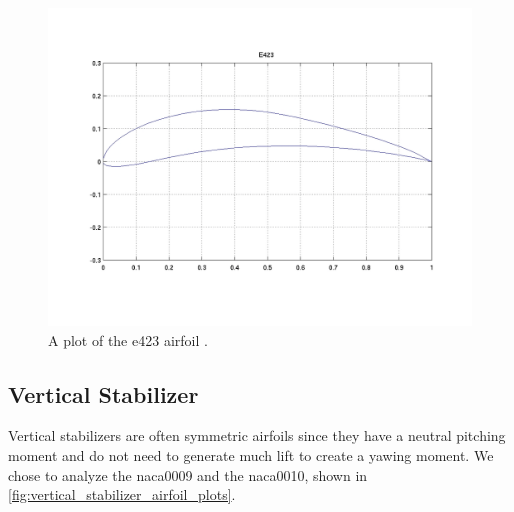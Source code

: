 \begin{figure}[htpb]
    \centering
    \includegraphics[width=0.49\linewidth]{Figures/E423.png}
    \caption[Airfoil choice for the horizontal stabilizer]{A plot of the \acrshort{e}423 airfoil \citep{uiuc2024}.}
    \label{fig:e423_plot}
\end{figure}

\subsection{Vertical Stabilizer}

Vertical stabilizers are often symmetric airfoils since they have a neutral pitching moment and do not need to generate much lift to create a yawing moment. We chose to analyze the \acrshort{naca}0009 and the \acrshort{naca}0010, shown in \autoref{fig:vertical_stabilizer_airfoil_plots}.

